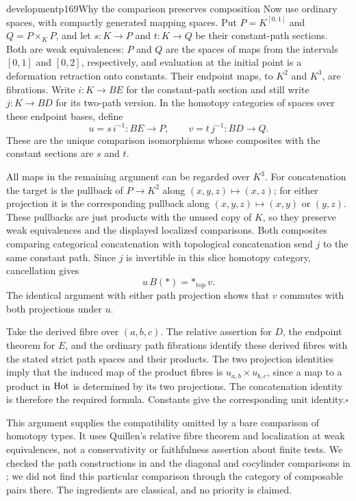 \begin{dcomment}{development}{p169}{Why the comparison preserves composition}
Now use ordinary spaces, with compactly generated mapping spaces. Put $P=K^{[0,1]}$ and $Q=P\times_K P$, and let $s:K\to P$ and $t:K\to Q$ be their constant-path sections. Both are weak equivalences: $P$ and $Q$ are the spaces of maps from the intervals $[0,1]$ and $[0,2]$, respectively, and evaluation at the initial point is a deformation retraction onto constants. Their endpoint maps, to $K^2$ and $K^3$, are fibrations. Write $i:K\to BE$ for the constant-path section and still write $j:K\to BD$ for its two-path version. In the homotopy categories of spaces over these endpoint bases, define
\[
 u=s\,i^{-1}:BE\longrightarrow P,
 \qquad
 v=t\,j^{-1}:BD\longrightarrow Q.
\]
These are the unique comparison isomorphisms whose composites with the constant sections are $s$ and $t$.

All maps in the remaining argument can be regarded over $K^3$. For concatenation the target is the pullback of $P\to K^2$ along $(x,y,z)\mapsto(x,z)$; for either projection it is the corresponding pullback along $(x,y,z)\mapsto(x,y)$ or $(y,z)$. These pullbacks are just products with the unused copy of $K$, so they preserve weak equivalences and the displayed localized comparisons. Both composites comparing categorical concatenation with topological concatenation send $j$ to the same constant path. Since $j$ is invertible in this slice homotopy category, cancellation gives
\[
                u\,B(\mathord{*})=\mathord{*}_{\mathrm{top}}\,v.
\]
The identical argument with either path projection shows that $v$ commutes with both projections under $u$.

Take the derived fibre over $(a,b,c)$. The relative assertion for $D$, the endpoint theorem for $E$, and the ordinary path fibrations identify these derived fibres with the stated strict path spaces and their products. The two projection identities imply that the induced map of the product fibres is $u_{a,b}\times u_{b,c}$, since a map to a product in $\mathrm{Hot}$ is determined by its two projections. The concatenation identity is therefore the required formula. Constants give the corresponding unit identity.\hfill$\square$

This argument supplies the compatibility omitted by a bare comparison of homotopy types. It uses Quillen's relative fibre theorem and localization at weak equivalences, not a conservativity or faithfulness assertion about finite tests. We checked the path constructions in \citet[Section~I.1]{Evrard1975} and the diagonal and cocylinder comparisons in \citet[Sections~1.5 and~2.1, Theorem~2.8]{Shoikhet2016}; we did not find this particular comparison through the category of composable pairs there. The ingredients are classical, and no priority is claimed.
\end{dcomment}


